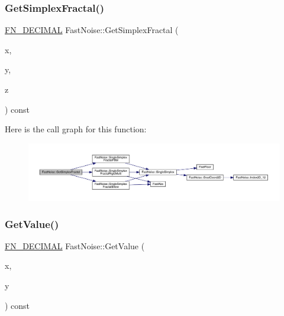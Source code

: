 \subsubsection{\texorpdfstring{Get\+Simplex\+Fractal()}{GetSimplexFractal()}\hspace{0.1cm}{\footnotesize\ttfamily [2/2]}}
{\footnotesize\ttfamily \mbox{\hyperlink{_fast_noise_8h_a75a9ef6d2541c4921815b885bfd449c3}{F\+N\+\_\+\+D\+E\+C\+I\+M\+AL}} Fast\+Noise\+::\+Get\+Simplex\+Fractal (\begin{DoxyParamCaption}\item[{\mbox{\hyperlink{_fast_noise_8h_a75a9ef6d2541c4921815b885bfd449c3}{F\+N\+\_\+\+D\+E\+C\+I\+M\+AL}}}]{x,  }\item[{\mbox{\hyperlink{_fast_noise_8h_a75a9ef6d2541c4921815b885bfd449c3}{F\+N\+\_\+\+D\+E\+C\+I\+M\+AL}}}]{y,  }\item[{\mbox{\hyperlink{_fast_noise_8h_a75a9ef6d2541c4921815b885bfd449c3}{F\+N\+\_\+\+D\+E\+C\+I\+M\+AL}}}]{z }\end{DoxyParamCaption}) const}

Here is the call graph for this function\+:
\nopagebreak
\begin{figure}[H]
\begin{center}
\leavevmode
\includegraphics[width=350pt]{class_fast_noise_a56b14e348cf0762010e6c58b6f5243f9_cgraph}
\end{center}
\end{figure}
\mbox{\label{class_fast_noise_a14145aaff0f8502eb5fd0f168562c69c}} 
\subsubsection{\texorpdfstring{Get\+Value()}{GetValue()}\hspace{0.1cm}{\footnotesize\ttfamily [1/2]}}
{\footnotesize\ttfamily \mbox{\hyperlink{_fast_noise_8h_a75a9ef6d2541c4921815b885bfd449c3}{F\+N\+\_\+\+D\+E\+C\+I\+M\+AL}} Fast\+Noise\+::\+Get\+Value (\begin{DoxyParamCaption}\item[{\mbox{\hyperlink{_fast_noise_8h_a75a9ef6d2541c4921815b885bfd449c3}{F\+N\+\_\+\+D\+E\+C\+I\+M\+AL}}}]{x,  }\item[{\mbox{\hyperlink{_fast_noise_8h_a75a9ef6d2541c4921815b885bfd449c3}{F\+N\+\_\+\+D\+E\+C\+I\+M\+AL}}}]{y }\end{DoxyParamCaption}) const}

